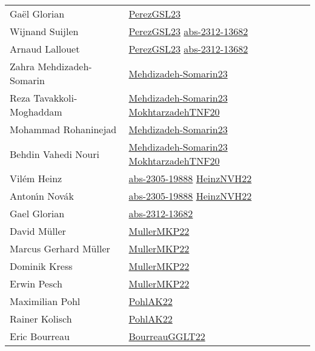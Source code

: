 {\begin{longtable}{p{4cm}p{15cm}}
Ga{\"{e}}l Glorian & \href{papers/PerezGSL23.pdf}{PerezGSL23}\cite{PerezGSL23} \\
Wijnand Suijlen & \href{papers/PerezGSL23.pdf}{PerezGSL23}\cite{PerezGSL23} \href{articles/abs-2312-13682.pdf}{abs-2312-13682}\cite{abs-2312-13682} \\
Arnaud Lallouet & \href{papers/PerezGSL23.pdf}{PerezGSL23}\cite{PerezGSL23} \href{articles/abs-2312-13682.pdf}{abs-2312-13682}\cite{abs-2312-13682} \\
Zahra Mehdizadeh{-}Somarin & \href{papers/Mehdizadeh-Somarin23.pdf}{Mehdizadeh-Somarin23}\cite{Mehdizadeh-Somarin23} \\
Reza Tavakkoli{-}Moghaddam & \href{papers/Mehdizadeh-Somarin23.pdf}{Mehdizadeh-Somarin23}\cite{Mehdizadeh-Somarin23} \href{articles/MokhtarzadehTNF20.pdf}{MokhtarzadehTNF20}\cite{MokhtarzadehTNF20} \\
Mohammad Rohaninejad & \href{papers/Mehdizadeh-Somarin23.pdf}{Mehdizadeh-Somarin23}\cite{Mehdizadeh-Somarin23} \\
Behdin Vahedi Nouri & \href{papers/Mehdizadeh-Somarin23.pdf}{Mehdizadeh-Somarin23}\cite{Mehdizadeh-Somarin23} \href{articles/MokhtarzadehTNF20.pdf}{MokhtarzadehTNF20}\cite{MokhtarzadehTNF20} \\
Vil{\'{e}}m Heinz & \href{articles/abs-2305-19888.pdf}{abs-2305-19888}\cite{abs-2305-19888} \href{articles/HeinzNVH22.pdf}{HeinzNVH22}\cite{HeinzNVH22} \\
Anton{\'{\i}}n Nov{\'{a}}k & \href{articles/abs-2305-19888.pdf}{abs-2305-19888}\cite{abs-2305-19888} \href{articles/HeinzNVH22.pdf}{HeinzNVH22}\cite{HeinzNVH22} \\
Gael Glorian & \href{articles/abs-2312-13682.pdf}{abs-2312-13682}\cite{abs-2312-13682} \\
David M{\"{u}}ller & \href{articles/MullerMKP22.pdf}{MullerMKP22}\cite{MullerMKP22} \\
Marcus Gerhard M{\"{u}}ller & \href{articles/MullerMKP22.pdf}{MullerMKP22}\cite{MullerMKP22} \\
Dominik Kress & \href{articles/MullerMKP22.pdf}{MullerMKP22}\cite{MullerMKP22} \\
Erwin Pesch & \href{articles/MullerMKP22.pdf}{MullerMKP22}\cite{MullerMKP22} \\
Maximilian Pohl & \href{articles/PohlAK22.pdf}{PohlAK22}\cite{PohlAK22} \\
Rainer Kolisch & \href{articles/PohlAK22.pdf}{PohlAK22}\cite{PohlAK22} \\
Eric Bourreau & \href{articles/BourreauGGLT22.pdf}{BourreauGGLT22}\cite{BourreauGGLT22} \\

\end{longtable}}
